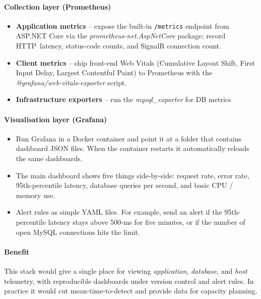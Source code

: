 \paragraph{Collection layer (Prometheus)}
\begin{itemize}
  \item \textbf{Application metrics} – expose the built-in
        \lstinline{/metrics} endpoint from ASP.NET Core via the
        \textit{prometheus-net.AspNetCore} package; record
        HTTP~latency, status-code counts, and SignalR connection count.
  \item \textbf{Client metrics} – ship front-end Web Vitals
        (Cumulative Layout Shift, First Input Delay, Largest Contentful Paint) to Prometheus with the
        \textit{@grafana/web-vitals-exporter} script.
  \item \textbf{Infrastructure exporters} – run the
        \textit{mysql\_exporter} for DB metrics
\end{itemize}

\paragraph{Visualisation layer (Grafana)}
\begin{itemize}
  \item Run Grafana in a Docker container and point it at a folder that
        contains dashboard JSON files. When the container restarts it
        automatically reloads the same dashboards.
  \item The main dashboard shows five things side-by-side: request rate,
        error rate, 95th-percentile latency, database queries per second, and
        basic CPU / memory use.
  \item Alert rules as simple YAML files. For example, send an alert if
        the 95th-percentile latency stays above 500-ms for five minutes, or
        if the number of open MySQL connections hits the limit.
\end{itemize}

\paragraph{Benefit}
This stack would give a single place for viewing \emph{application},
\emph{database}, and \emph{host} telemetry, with reproducible dashboards
under version control and alert rules. In practice it would cut mean-time-to-detect and provide data for capacity planning.


